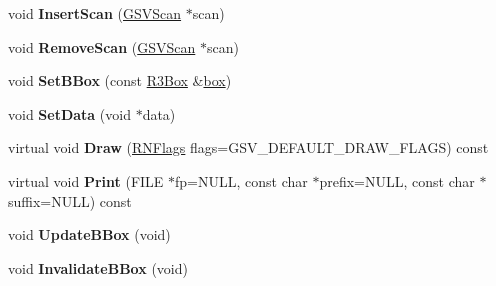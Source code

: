 \begin{DoxyCompactItemize}
\item 
void {\bfseries Insert\+Scan} (\hyperlink{class_g_s_v_scan}{G\+S\+V\+Scan} $\ast$scan)\hypertarget{class_g_s_v_laser_a346614f951369a865c55148dc8ec148b}{}\label{class_g_s_v_laser_a346614f951369a865c55148dc8ec148b}

\item 
void {\bfseries Remove\+Scan} (\hyperlink{class_g_s_v_scan}{G\+S\+V\+Scan} $\ast$scan)\hypertarget{class_g_s_v_laser_a76edd93fd8e0c05502d25edfc2df78e6}{}\label{class_g_s_v_laser_a76edd93fd8e0c05502d25edfc2df78e6}

\item 
void {\bfseries Set\+B\+Box} (const \hyperlink{class_r3_box}{R3\+Box} \&\hyperlink{structbox}{box})\hypertarget{class_g_s_v_laser_a35c8d67d2e0f3833cb077cdd2c466674}{}\label{class_g_s_v_laser_a35c8d67d2e0f3833cb077cdd2c466674}

\item 
void {\bfseries Set\+Data} (void $\ast$data)\hypertarget{class_g_s_v_laser_a176cf94a8cdcf97022550f437227e5f4}{}\label{class_g_s_v_laser_a176cf94a8cdcf97022550f437227e5f4}

\item 
virtual void {\bfseries Draw} (\hyperlink{class_r_n_flags}{R\+N\+Flags} flags=G\+S\+V\+\_\+\+D\+E\+F\+A\+U\+L\+T\+\_\+\+D\+R\+A\+W\+\_\+\+F\+L\+A\+GS) const \hypertarget{class_g_s_v_laser_ae5ef5b687e4b3ad9dfdb98d171454a68}{}\label{class_g_s_v_laser_ae5ef5b687e4b3ad9dfdb98d171454a68}

\item 
virtual void {\bfseries Print} (F\+I\+LE $\ast$fp=N\+U\+LL, const char $\ast$prefix=N\+U\+LL, const char $\ast$suffix=N\+U\+LL) const \hypertarget{class_g_s_v_laser_a4c94b234a9e63cb021b3b2cdc7a51db7}{}\label{class_g_s_v_laser_a4c94b234a9e63cb021b3b2cdc7a51db7}

\item 
void {\bfseries Update\+B\+Box} (void)\hypertarget{class_g_s_v_laser_a9b9bb3e54545524fef513adab8a9a4f5}{}\label{class_g_s_v_laser_a9b9bb3e54545524fef513adab8a9a4f5}

\item 
void {\bfseries Invalidate\+B\+Box} (void)\hypertarget{class_g_s_v_laser_aefac4439d2229ba561d4eaee5200e6e3}{}\label{class_g_s_v_laser_aefac4439d2229ba561d4eaee5200e6e3}

\end{DoxyCompactItemize}
